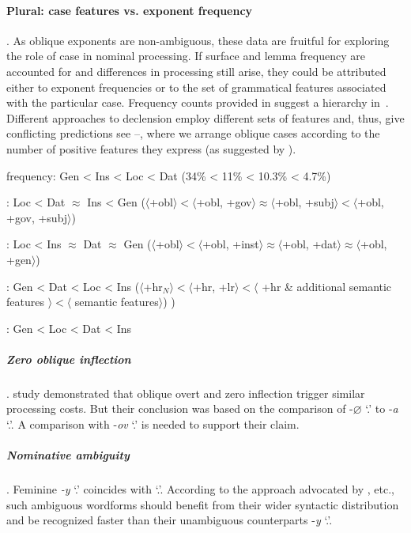 \documentclass[output=paper, modfonts,newtxmath,hidelinks]{langscibook}
\begin{document}
\paragraph*{Plural: case features vs. exponent frequency}. As oblique  exponents are non-ambiguous, these data are fruitful for exploring the role of case in nominal processing. If surface and lemma frequency are accounted for and differences in  processing still arise, they could be attributed either to exponent frequencies or to the set of grammatical features associated with the particular case. Frequency counts provided in \citet{samojlova2014frequencies} suggest a hierarchy in~. Different approaches to  declension employ different sets of features and, thus, give conflicting predictions see --, where we arrange oblique cases according to the number of positive features they express (as suggested by \citealt{clahsen2001mental}).

\ea \ea \label{ex:freqpl} frequency: Gen < Ins < Loc < Dat (34\% < 11\% < 10.3\% < 4.7\%)
    
    \ex \label{ex:mueller}  \citealt{muller2004decomposing}: Loc < Dat $\approx$ Ins < Gen ($\langle$+obl$\rangle < \langle$+obl, +gov$\rangle \approx \langle$+obl, +subj$\rangle < \langle$+obl, +gov, +subj$\rangle$)
    
    \ex \label{ex:wiese}	\citealt{wiese2004categories}:  Loc < Ins $\approx$ Dat $\approx$ Gen ($\langle$+obl$\rangle < \langle$+obl, +inst$\rangle \approx \langle$+obl, +dat$\rangle \approx \langle$+obl, +gen$\rangle$)
    
    \ex \label{ex:wunderlich}	\citealt{wunderlich1996minimalist}: Gen < Dat < Loc < Ins ($\langle$+hr$_N \rangle < \langle$+hr, +lr$\rangle < \langle$ +hr \& additional semantic features $\rangle < \langle$ semantic features$\rangle$) 
)
    
    \ex \label{ex:caha} \citealt{caha2008case}: Gen < Loc < Dat < Ins
    \z
\z

\subparagraph*{{Zero oblique inflection}}.  study demonstrated that oblique overt and zero inflection trigger similar processing costs. But their conclusion was based on the comparison of  -$\varnothing$ `\genn.\pl' to  -\textit{a} `\genn.\sg'. A comparison with  -\textit{ov} `\genn.\pl' is needed to support their claim.

\subparagraph*{{Nominative ambiguity}}. Feminine \textit{-y} `\nomm.\pl' coincides with `\genn.\sg'. According to the approach advocated by \citet{kostic1991informational}, etc., such ambiguous wordforms should benefit from their wider syntactic distribution and be recognized faster than their unambiguous  counterparts -\textit{y} `\nomm.\pl'.
\end{document}
